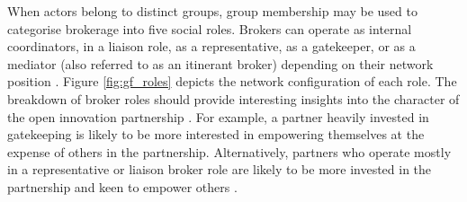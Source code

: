 When actors belong to distinct groups, group membership may be used to categorise brokerage into five social roles. Brokers can operate as internal coordinators, in a liaison role, as a representative, as a gatekeeper, or as a mediator (also referred to as an itinerant broker) depending on their network position \citep{gould1989structures}. Figure \ref{fig:gf_roles} depicts the network configuration of each role. The breakdown of broker roles should provide interesting insights into the character of the open innovation partnership \citep{spiro2013extended}. For example, a partner heavily invested in gatekeeping is likely to be more interested in empowering themselves at the expense of others in the partnership. Alternatively, partners who operate mostly in a representative or liaison broker role are likely to be more invested in the partnership and keen to empower others \citep{spiro2013extended}. \medskip

